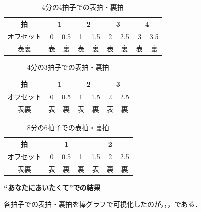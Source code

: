 \begin{table}[htb]
  \centering
  \caption{4分の4拍子での表拍・裏拍}
  \begin{tabular}{|c||c|c|c|c|c|c|c|c|} \hline
    拍     & \multicolumn{2}{|c|}{1} & \multicolumn{2}{|c|}{2} & \multicolumn{2}{|c|}{3} & \multicolumn{2}{|c|}{4}                     \\ \hline\hline
    オフセット & 0                       & 0.5                     & 1                       & 1.5                     & 2 & 2.5 & 3 & 3.5 \\ \hline
    表裏    & 表                       & 裏                       & 表                       & 裏                       & 表 & 裏   & 表 & 裏   \\ \hline
  \end{tabular}
  \label{omoura_44}
\end{table}

\begin{table}[htb]
  \centering
  \caption{4分の3拍子での表拍・裏拍}
  \begin{tabular}{|c||c|c|c|c|c|c|} \hline
    拍     & \multicolumn{2}{|c|}{1} & \multicolumn{2}{|c|}{2} & \multicolumn{2}{|c|}{3}                 \\ \hline\hline
    オフセット & 0                       & 0.5                     & 1                       & 1.5 & 2 & 2.5 \\ \hline
    表裏    & 表                       & 裏                       & 表                       & 裏   & 表 & 裏   \\ \hline
  \end{tabular}
  \label{omoura_34}
\end{table}

\begin{table}[htb]
  \centering
  \caption{8分の6拍子での表拍・裏拍}
  \begin{tabular}{|c||c|c|c|c|c|c|} \hline
    拍     & \multicolumn{3}{|c|}{1} & \multicolumn{3}{|c|}{2}                     \\ \hline\hline
    オフセット & 0                       & 0.5                     & 1 & 1.5 & 2 & 2.5 \\ \hline
    表裏    & 表                       & 裏                       & 裏 & 表   & 裏 & 裏   \\ \hline
  \end{tabular}
  \label{omoura_68}
\end{table}

\textbf{“あなたにあいたくて”での結果}\par
各拍子での表拍・裏拍を棒グラフで可視化したのが，，，である．


